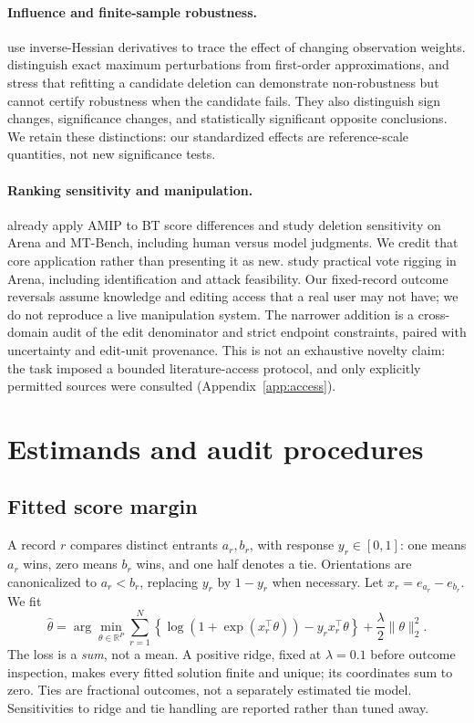 \documentclass{article}
\begin{document}
\paragraph{Influence and finite-sample robustness.}
\citet{koh2017influence} use inverse-Hessian derivatives to trace the effect of changing observation weights. \citet{broderick2020amip} distinguish exact maximum perturbations from first-order approximations, and stress that refitting a candidate deletion can demonstrate non-robustness but cannot certify robustness when the candidate fails. They also distinguish sign changes, significance changes, and statistically significant opposite conclusions. We retain these distinctions: our standardized effects are reference-scale quantities, not new significance tests.

\paragraph{Ranking sensitivity and manipulation.}
\citet{huang2025dropping} already apply AMIP to BT score differences and study deletion sensitivity on Arena and MT-Bench, including human versus model judgments. We credit that core application rather than presenting it as new. \citet{min2025rigging} study practical vote rigging in Arena, including identification and attack feasibility. Our fixed-record outcome reversals assume knowledge and editing access that a real user may not have; we do not reproduce a live manipulation system. The narrower addition is a cross-domain audit of the edit denominator and strict endpoint constraints, paired with uncertainty and edit-unit provenance. This is not an exhaustive novelty claim: the task imposed a bounded literature-access protocol, and only explicitly permitted sources were consulted (Appendix~\ref{app:access}).

\section{Estimands and audit procedures}\label{sec:method}
\subsection{Fitted score margin}
A record $r$ compares distinct entrants $a_r,b_r$, with response $y_r\in[0,1]$: one means $a_r$ wins, zero means $b_r$ wins, and one half denotes a tie. Orientations are canonicalized to $a_r<b_r$, replacing $y_r$ by $1-y_r$ when necessary. Let $x_r=e_{a_r}-e_{b_r}$. We fit
\begin{equation}\label{eq:bt}
 \widehat\theta=\arg\min_{\theta\in\mathbb R^P}
 \sum_{r=1}^N\left\{\log(1+\exp(x_r^\top\theta))-y_rx_r^\top\theta\right\}
 +\frac{\lambda}{2}\|\theta\|_2^2.
\end{equation}
The loss is a \emph{sum}, not a mean. A positive ridge, fixed at $\lambda=0.1$ before outcome inspection, makes every fitted solution finite and unique; its coordinates sum to zero. Ties are fractional outcomes, not a separately estimated tie model. Sensitivities to ridge and tie handling are reported rather than tuned away.
\end{document}
